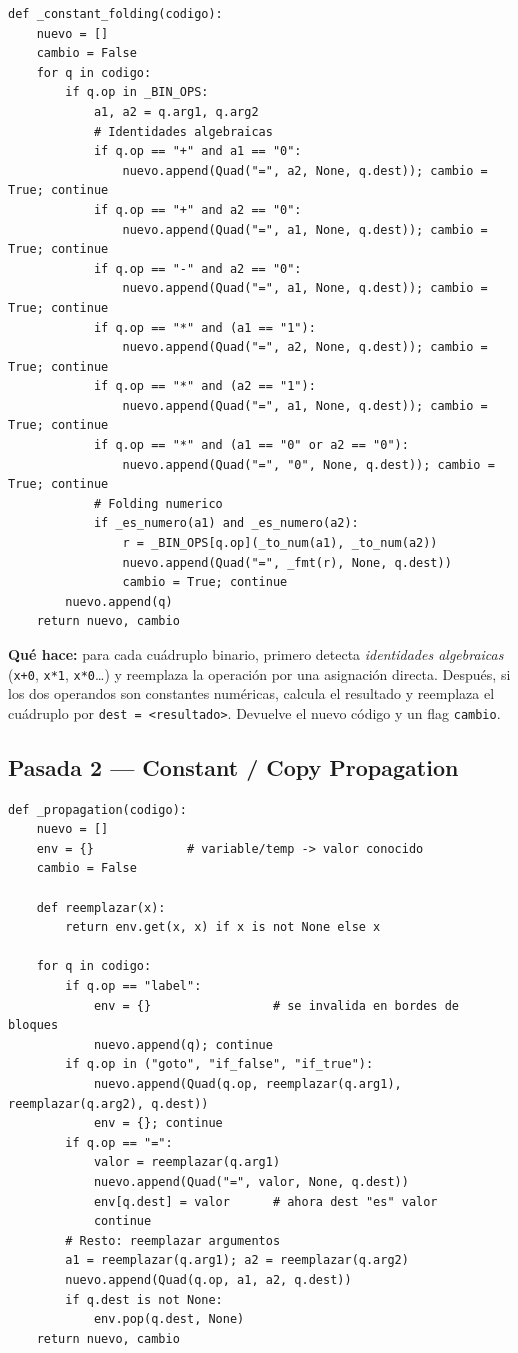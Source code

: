 \documentclass[11pt,a4paper]{article}
\begin{document}
\begin{lstlisting}[style=py]
def _constant_folding(codigo):
    nuevo = []
    cambio = False
    for q in codigo:
        if q.op in _BIN_OPS:
            a1, a2 = q.arg1, q.arg2
            # Identidades algebraicas
            if q.op == "+" and a1 == "0":
                nuevo.append(Quad("=", a2, None, q.dest)); cambio = True; continue
            if q.op == "+" and a2 == "0":
                nuevo.append(Quad("=", a1, None, q.dest)); cambio = True; continue
            if q.op == "-" and a2 == "0":
                nuevo.append(Quad("=", a1, None, q.dest)); cambio = True; continue
            if q.op == "*" and (a1 == "1"):
                nuevo.append(Quad("=", a2, None, q.dest)); cambio = True; continue
            if q.op == "*" and (a2 == "1"):
                nuevo.append(Quad("=", a1, None, q.dest)); cambio = True; continue
            if q.op == "*" and (a1 == "0" or a2 == "0"):
                nuevo.append(Quad("=", "0", None, q.dest)); cambio = True; continue
            # Folding numerico
            if _es_numero(a1) and _es_numero(a2):
                r = _BIN_OPS[q.op](_to_num(a1), _to_num(a2))
                nuevo.append(Quad("=", _fmt(r), None, q.dest))
                cambio = True; continue
        nuevo.append(q)
    return nuevo, cambio
\end{lstlisting}

\textbf{Qué hace:} para cada cuádruplo binario, primero detecta
\textit{identidades algebraicas} (\texttt{x+0}, \texttt{x*1},
\texttt{x*0}\dots) y reemplaza la operación por una asignación directa.
Después, si los dos operandos son constantes numéricas, calcula el
resultado y reemplaza el cuádruplo por \texttt{dest = <resultado>}.
Devuelve el nuevo código y un flag \texttt{cambio}.

\subsection{Pasada 2 --- Constant / Copy Propagation}

\begin{lstlisting}[style=py]
def _propagation(codigo):
    nuevo = []
    env = {}             # variable/temp -> valor conocido
    cambio = False

    def reemplazar(x):
        return env.get(x, x) if x is not None else x

    for q in codigo:
        if q.op == "label":
            env = {}                 # se invalida en bordes de bloques
            nuevo.append(q); continue
        if q.op in ("goto", "if_false", "if_true"):
            nuevo.append(Quad(q.op, reemplazar(q.arg1), reemplazar(q.arg2), q.dest))
            env = {}; continue
        if q.op == "=":
            valor = reemplazar(q.arg1)
            nuevo.append(Quad("=", valor, None, q.dest))
            env[q.dest] = valor      # ahora dest "es" valor
            continue
        # Resto: reemplazar argumentos
        a1 = reemplazar(q.arg1); a2 = reemplazar(q.arg2)
        nuevo.append(Quad(q.op, a1, a2, q.dest))
        if q.dest is not None:
            env.pop(q.dest, None)
    return nuevo, cambio
\end{lstlisting}
\end{document}
